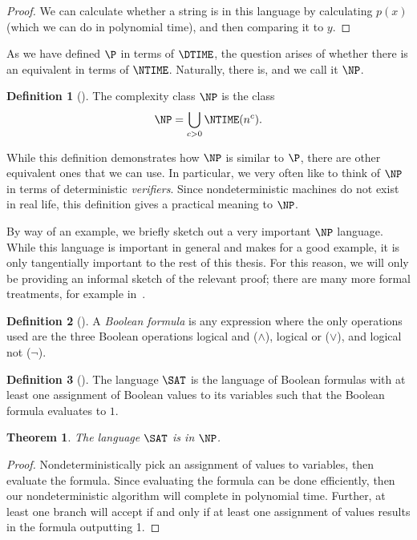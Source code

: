 \documentclass[english,12pt]{reedthesis}
\theoremstyle{plain}
\newtheorem{thm}{Theorem}[section]
\theoremstyle{definition}
\newtheorem{defn}[defn]{Definition}
\theoremstyle{remark}
\begin{document}
\begin{proof}
  We can calculate whether a string is in this language by calculating $p(x)$
  (which we can do in polynomial time), and then comparing it to $y$.
\end{proof}

As we have defined $\P$ in terms of $\DTIME$, the question arises of whether
there is an equivalent in terms of $\NTIME$. Naturally, there is, and we call it
$\NP$.

\begin{defn}[{\cite[Cor.\ 7.22]{Sip97}}]\label{def:np}
  The complexity class $\NP$ is the class
  \[
    \NP = \bigcup_{c > 0}\NTIME(n^{c}).
  \]
\end{defn}

While this definition demonstrates how $\NP$ is similar to $\P$, there are other
equivalent ones that we can use. In particular, we very often like to think of
$\NP$ in terms of deterministic \emph{verifiers}. Since nondeterministic
machines do not exist in real life, this definition gives a practical meaning to
$\NP$.

By way of an example, we briefly sketch out a very important $\NP$ language.
While this language is important in general and makes for a good example, it is
only tangentially important to the rest of this thesis. For this reason, we will
only be providing an informal sketch of the relevant proof; there are many more
formal treatments, for example in~\cite{Sip97}.

\begin{defn}[{\cite[299]{Sip97}}]\label{def:bool-formula}
  A \emph{Boolean formula} is any expression where the only operations used are
  the three Boolean operations logical and ($\wedge$), logical or ($\vee$), and logical
  not ($\neg$).
\end{defn}

\begin{defn}[{\cite[299]{Sip97}}]\label{def:sat}
  The language $\SAT$ is the language of Boolean formulas with at least one
  assignment of Boolean values to its variables such that the Boolean formula
  evaluates to $1$.
\end{defn}

\begin{thm}\label{thm:sat-is-np}
  The language $\SAT$ is in $\NP$.
\end{thm}

\begin{proof}
  Nondeterministically pick an assignment of values to variables, then evaluate
  the formula. Since evaluating the formula can be done efficiently, then our
  nondeterministic algorithm will complete in polynomial time. Further, at least
  one branch will accept if and only if at least one assignment of values
  results in the formula outputting 1.
\end{proof}
\end{document}
